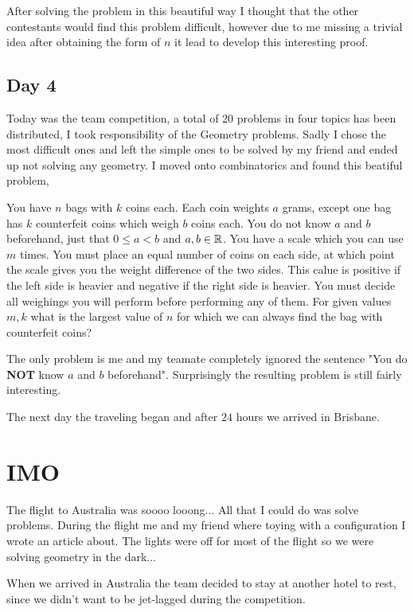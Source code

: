 \documentclass{article}
\begin{document}
After solving the problem in this beautiful way I thought that the other contestants would find this problem difficult, however due to me missing a trivial idea after obtaining the form of \(n\) it lead to develop this interesting proof.

\subsection{Day 4}
Today was the team competition, a total of 20 problems in four topics has been distributed, I took responsibility of the Geometry problems. Sadly I chose the most difficult ones and left the simple ones to be solved by my friend and ended up not solving any geometry. I moved onto combinatorics and found this beatiful problem,
\begin{problem}
  You have \(n\) bags with \(k\) coins each. Each coin weights \(a\) grams, except one bag has \(k\) counterfeit coins which weigh \(b\) coins each. You do not know \(a\) and \(b\) beforehand, just that \(0 \leq a < b\) and \(a, b \in \mathbb{R}\). You have a scale which you can use \(m\) times. You must place an equal number of coins on each side, at which point the scale gives you the weight difference of the two sides. This calue is positive if the left side is heavier and negative if the right side is heavier. You must decide all weighings you will perform before performing any of them. For given values \(m, k\) what is the largest value of \(n\) for which we can always find the bag with counterfeit coins?
\end{problem}
The only problem is me and my teamate completely ignored the sentence "You do \textbf{NOT} know \(a\) and \(b\) beforehand". Surprisingly the resulting problem is still fairly interesting.

The next day the traveling began and after \(24\) hours we arrived in Brisbane.
\section{IMO}

The flight to Australia was soooo looong... All that I could do was solve problems. During the flight me and my friend where toying with a configuration I wrote an article about. The lights were off for most of the flight so we were solving geometry in the dark...

When we arrived in Australia the team decided to stay at another hotel to rest, since we didn't want to be jet-lagged during the competition.
\end{document}
